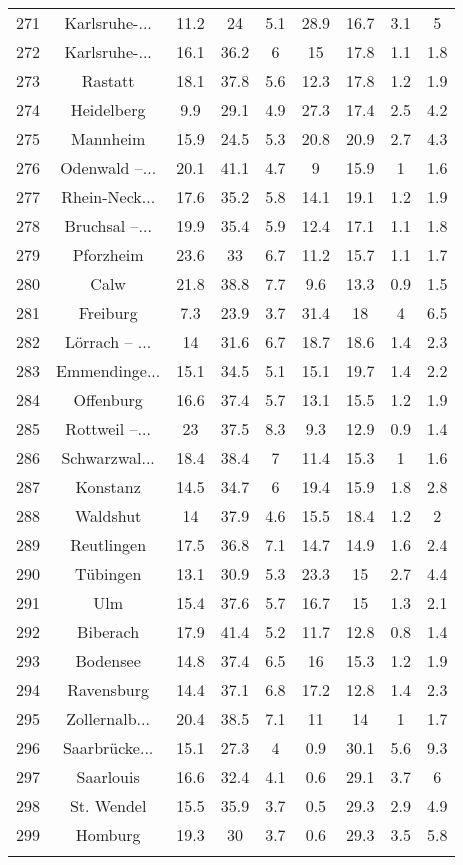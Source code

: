 \begin{table}[!htbp]
\begin{tabular}{@{\extracolsep{5pt}} ccccccccc}
271 & Karlsruhe-... & 11.2 & 24 & 5.1 & 28.9 & 16.7 & 3.1 & 5 \\ 
272 & Karlsruhe-... & 16.1 & 36.2 & 6 & 15 & 17.8 & 1.1 & 1.8 \\ 
273 & Rastatt & 18.1 & 37.8 & 5.6 & 12.3 & 17.8 & 1.2 & 1.9 \\ 
274 & Heidelberg & 9.9 & 29.1 & 4.9 & 27.3 & 17.4 & 2.5 & 4.2 \\ 
275 & Mannheim & 15.9 & 24.5 & 5.3 & 20.8 & 20.9 & 2.7 & 4.3 \\ 
276 & Odenwald –... & 20.1 & 41.1 & 4.7 & 9 & 15.9 & 1 & 1.6 \\ 
277 & Rhein-Neck... & 17.6 & 35.2 & 5.8 & 14.1 & 19.1 & 1.2 & 1.9 \\ 
278 & Bruchsal –... & 19.9 & 35.4 & 5.9 & 12.4 & 17.1 & 1.1 & 1.8 \\ 
279 & Pforzheim & 23.6 & 33 & 6.7 & 11.2 & 15.7 & 1.1 & 1.7 \\ 
280 & Calw & 21.8 & 38.8 & 7.7 & 9.6 & 13.3 & 0.9 & 1.5 \\ 
281 & Freiburg & 7.3 & 23.9 & 3.7 & 31.4 & 18 & 4 & 6.5 \\ 
282 & Lörrach – ... & 14 & 31.6 & 6.7 & 18.7 & 18.6 & 1.4 & 2.3 \\ 
283 & Emmendinge... & 15.1 & 34.5 & 5.1 & 15.1 & 19.7 & 1.4 & 2.2 \\ 
284 & Offenburg & 16.6 & 37.4 & 5.7 & 13.1 & 15.5 & 1.2 & 1.9 \\ 
285 & Rottweil –... & 23 & 37.5 & 8.3 & 9.3 & 12.9 & 0.9 & 1.4 \\ 
286 & Schwarzwal... & 18.4 & 38.4 & 7 & 11.4 & 15.3 & 1 & 1.6 \\ 
287 & Konstanz & 14.5 & 34.7 & 6 & 19.4 & 15.9 & 1.8 & 2.8 \\ 
288 & Waldshut & 14 & 37.9 & 4.6 & 15.5 & 18.4 & 1.2 & 2 \\ 
289 & Reutlingen & 17.5 & 36.8 & 7.1 & 14.7 & 14.9 & 1.6 & 2.4 \\ 
290 & Tübingen & 13.1 & 30.9 & 5.3 & 23.3 & 15 & 2.7 & 4.4 \\ 
291 & Ulm & 15.4 & 37.6 & 5.7 & 16.7 & 15 & 1.3 & 2.1 \\ 
292 & Biberach & 17.9 & 41.4 & 5.2 & 11.7 & 12.8 & 0.8 & 1.4 \\ 
293 & Bodensee & 14.8 & 37.4 & 6.5 & 16 & 15.3 & 1.2 & 1.9 \\ 
294 & Ravensburg & 14.4 & 37.1 & 6.8 & 17.2 & 12.8 & 1.4 & 2.3 \\ 
295 & Zollernalb... & 20.4 & 38.5 & 7.1 & 11 & 14 & 1 & 1.7 \\ 
296 & Saarbrücke... & 15.1 & 27.3 & 4 & 0.9 & 30.1 & 5.6 & 9.3 \\ 
297 & Saarlouis & 16.6 & 32.4 & 4.1 & 0.6 & 29.1 & 3.7 & 6 \\ 
298 & St. Wendel & 15.5 & 35.9 & 3.7 & 0.5 & 29.3 & 2.9 & 4.9 \\ 
299 & Homburg & 19.3 & 30 & 3.7 & 0.6 & 29.3 & 3.5 & 5.8 \\ 
\hline \\[-1.8ex] 
\end{tabular} 
\end{table} 
